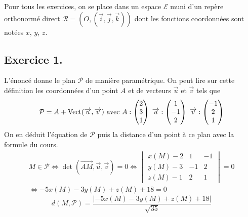 Pour tous les exercices, on se place dans un espace $\mathcal{E}$ muni d'un repère orthonormé direct $\mathcal R = (O,(\overrightarrow i , \overrightarrow j , \overrightarrow k))$ dont les fonctions coordonnées sont notées $x$, $y$, $z$.
\subsection*{Exercice 1.}
L'énoncé donne le plan $\mathcal{P}$ de manière paramétrique. On peut lire sur cette définition les coordonnées d'un point $A$ et de vecteurs $\overrightarrow u$  et $\overrightarrow v$ tels que
\begin{displaymath}
 \mathcal{P} = A +\operatorname{Vect}(\overrightarrow u , \overrightarrow v)\text{ avec }
A :
\begin{pmatrix}
 2\\3\\1
\end{pmatrix}
\;
\overrightarrow u :
\begin{pmatrix}
 1\\-1\\2
\end{pmatrix}
\;
\overrightarrow v :
\begin{pmatrix}
 -1\\2\\1
\end{pmatrix}
\end{displaymath}
On en déduit l'équation de $\mathcal{P}$ puis la distance d'un point à ce plan avec la formule du cours.
\begin{multline*}
 M\in \mathcal{P}\Leftrightarrow
\det(\overrightarrow{AM},\overrightarrow u, \overrightarrow v)=0
\Leftrightarrow
\begin{vmatrix}
 x(M)-2 & 1  & -1 \\
 y(M)-3 & -1 & 2  \\
 z(M)-1 & 2  & 1
\end{vmatrix} =0\\
\Leftrightarrow 
-5x(M)-3y(M)+z(M)+18=0
\end{multline*}
\begin{displaymath}
 d(M,\mathcal{P})=\frac{\left\vert -5x(M)-3y(M)+z(M)+18 \right\vert}{\sqrt{35}}
\end{displaymath}

